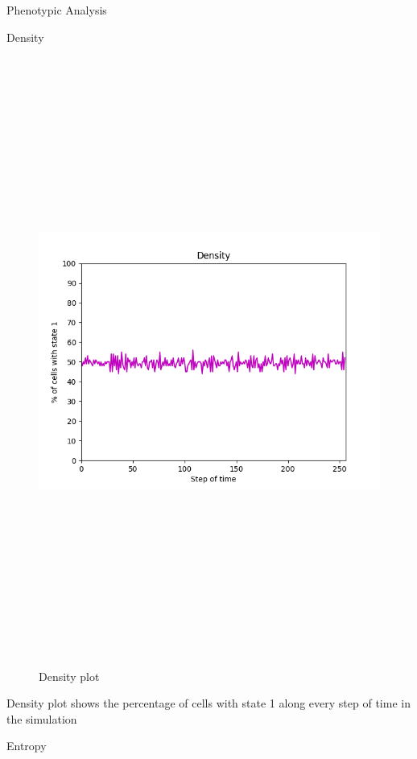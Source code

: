 \documentclass[12pt, letterpaper]{article}
\begin{document}
\begin{section}{Phenotypic Analysis} 
	\begin{subsection}{Density} 
		\begin{figure}[H] 
		\centering 
				\includegraphics[max width=200mm, max height=200mm, keepaspectratio]{SimDensity.png} 
			\caption{Density plot} 
		\end{figure} 
	\end{subsection} 
Density plot shows the percentage of cells with state 1 along every step of time in the simulation	\begin{subsection}{Entropy} 
		\begin{figure}[H] 
		\centering 

\end{figure}
\end{subsection}
\end{section}
\end{document}
